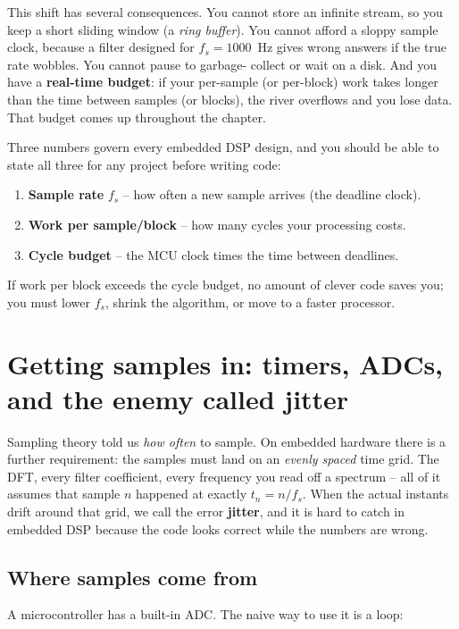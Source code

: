This shift has several consequences. You cannot store an infinite stream, so you keep a short
sliding window (a \emph{ring buffer}). You cannot afford a sloppy sample clock, because a filter
designed for $f_s = 1000$~Hz gives wrong answers if the true rate wobbles. You cannot pause to garbage-
collect or wait on a disk. And you have a \textbf{real-time budget}: if your per-sample (or
per-block) work takes longer than the time between samples (or blocks), the river overflows and
you lose data. That budget comes up throughout the chapter.

\begin{focusbox}
Three numbers govern every embedded DSP design, and you should be able to state all three for any
project before writing code:
\begin{enumerate}
  \item \textbf{Sample rate} $f_s$ -- how often a new sample arrives (the deadline clock).
  \item \textbf{Work per sample/block} -- how many cycles your processing costs.
  \item \textbf{Cycle budget} -- the MCU clock times the time between deadlines.
\end{enumerate}
If work per block exceeds the cycle budget, no amount of clever code saves you; you must lower
$f_s$, shrink the algorithm, or move to a faster processor.
\end{focusbox}

\section{Getting samples in: timers, ADCs, and the enemy called jitter}
\label{ch40:sampling}

Sampling theory told us \emph{how often} to sample. On embedded hardware there is a further
requirement: the samples must land on an \emph{evenly spaced} time grid. The DFT, every filter
coefficient, every frequency you read off a spectrum -- all of it assumes that sample $n$ happened
at exactly $t_n = n/f_s$. When the actual instants drift around that grid, we call the error
\textbf{jitter}, and it is hard to catch in embedded DSP because the code
looks correct while the numbers are wrong.

\subsection{Where samples come from}

A microcontroller has a built-in ADC. The naive way to use it is a loop:

